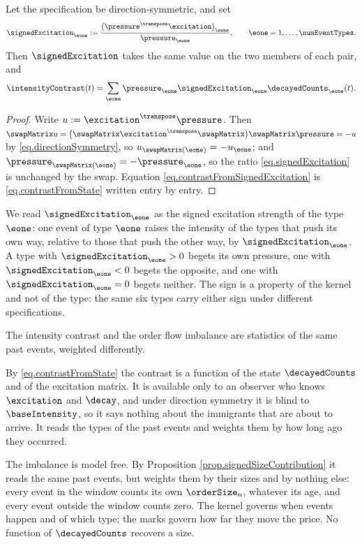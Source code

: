 \begin{prop}\label{prop.signedExcitation}
 Let the specification be direction-symmetric, and set
 \begin{equation}\label{eq.signedExcitation}
  \signedExcitation_{\eone}
  := \frac{\big( \pressure^{\transpose}\excitation \big)_{\eone}}{\pressure_{\eone}} ,
  \qquad \eone = 1, \dots, \numEventTypes .
 \end{equation}
 Then $\signedExcitation$ takes the same value on the two members of each pair, and
 \begin{equation}\label{eq.contrastFromSignedExcitation}
  \intensityContrast(t)
  = \sum_{\eone} \pressure_{\eone} \signedExcitation_{\eone}
  \decayedCounts_{\eone}(t) .
 \end{equation}
\end{prop}
\begin{proof}
 Write $u := \excitation^{\transpose}\pressure$.
 Then $\swapMatrix u
 = \big( \swapMatrix \excitation^{\transpose} \swapMatrix \big) \swapMatrix \pressure
 = -u$ by \eqref{eq.directionSymmetry},
 so $u_{\swapMatrix(\eone)} = -u_{\eone}$;
 and $\pressure_{\swapMatrix(\eone)} = -\pressure_{\eone}$,
 so the ratio \eqref{eq.signedExcitation} is unchanged by the swap.
 Equation \eqref{eq.contrastFromSignedExcitation} is
 \eqref{eq.contrastFromState} written entry by entry.
\end{proof}

We read $\signedExcitation_{\eone}$ as the signed excitation strength of the type $\eone$:
one event of type $\eone$ raises the intensity of the types that push its own way, relative
to those that push the other way, by $\signedExcitation_{\eone}$.
A type with $\signedExcitation_{\eone} > 0$ begets its own pressure,
one with $\signedExcitation_{\eone} < 0$ begets the opposite,
and one with $\signedExcitation_{\eone} = 0$ begets neither.
The sign is a property of the kernel and not of the type:
the same six types carry either sign under different specifications.

The intensity contrast and the order flow imbalance are statistics of the same past events,
weighted differently.

By \eqref{eq.contrastFromState} the contrast is a function of the state $\decayedCounts$ and
of the excitation matrix.
It is available only to an observer who knows $\excitation$ and $\decay$,
and under direction symmetry it is blind to $\baseIntensity$,
so it says nothing about the immigrants that are about to arrive.
It reads the types of the past events and weights them by how long ago they occurred.

The imbalance is model free.
By Proposition \ref{prop.signedSizeContribution} it reads the same past events,
but weights them by their sizes and by nothing else:
every event in the window counts its own $\orderSize_n$, whatever its age,
and every event outside the window counts zero.
The kernel governs when events happen and of which type;
the marks govern how far they move the price.
No function of $\decayedCounts$ recovers a size.
